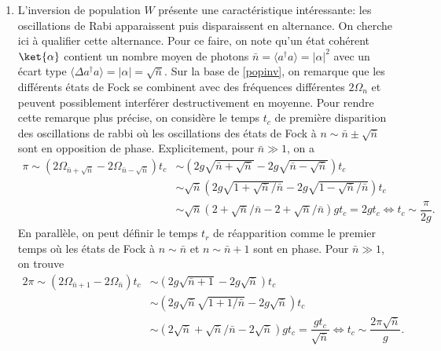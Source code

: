{\begin{enumerate}
    \item L'inversion de population $W$ présente une caractéristique intéressante: les oscillations de Rabi apparaissent puis disparaissent en alternance. On cherche ici à qualifier cette alternance. Pour ce faire, on note qu'un état cohérent $\ket{\alpha}$ contient un nombre moyen de photons $\bar{n} = \langle a^\dagger a\rangle = |\alpha|^2$ avec un écart type $  \langle \Delta a^\dagger a\rangle = |\alpha| = \sqrt{\bar{n}}$. Sur la base de \eqref{popinv}, on remarque que les différents états de Fock se combinent avec des fréquences différentes $2 \Omega_n$ et peuvent possiblement interférer destructivement en moyenne. Pour rendre cette remarque plus précise, on considère le temps $t_c$ de première disparition des oscillations de rabbi  où les oscillations des états de Fock à $n \sim \bar{n} \pm \sqrt{\bar{n}}$ sont en opposition de phase. Explicitement, pour $\bar{n}\gg 1$, on a  
    \begin{align}
        \pi \sim (2\Omega_{\bar{n} + \sqrt{\bar{n}}} - 2\Omega_{\bar{n} - \sqrt{\bar{n}}}) t_c &\sim \left(2g\sqrt{\bar{n} + \sqrt{\bar{n}}} - 2g\sqrt{\bar{n} - \sqrt{\bar{n}}}\right) t_c \nonumber \\
        &\sim \sqrt{\bar{n}}\left(2g\sqrt{1 + \sqrt{\bar{n}}/\bar{n}} - 2g\sqrt{1 - \sqrt{\bar{n}}/\bar{n}}\right) t_c \nonumber \\ &\sim \sqrt{\bar{n}}\left(2 + \sqrt{\bar{n}}/\bar{n} - 2 + \sqrt{\bar{n}}/\bar{n}\right) gt_c  = 2g t_c \iff t_c \sim \dfrac{\pi}{2g}. \label{tc}
    \end{align}
    En parallèle, on peut définir le temps $t_r$ de réapparition comme le premier temps où les états de Fock à $n \sim \bar{n}$ et $n \sim \bar{n}+1$ sont en phase. Pour $\bar{n}\gg 1$, on trouve 
    \begin{align*}
        2\pi \sim (2\Omega_{\bar{n} + 1} - 2\Omega_{\bar{n}}) t_c &\sim \left(2g\sqrt{\bar{n} + 1} - 2g\sqrt{\bar{n}}\right) t_c \nonumber \\
        &\sim \left(2g\sqrt{\bar{n}}\sqrt{1 + 1/\bar{n}} - 2g\sqrt{\bar{n}}\right) t_c \nonumber \\ &\sim \left(2\sqrt{\bar{n}} + \sqrt{\bar{n}}/\bar{n} - 2 \sqrt{\bar{n}}\right) gt_c  = \dfrac{g t_c}{\sqrt{\bar{n}}} \iff t_c \sim \dfrac{2\pi \sqrt{\bar{n}}}{g}.
    \end{align*}

\end{enumerate}}
